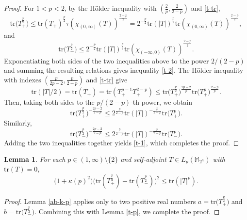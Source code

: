 \documentclass{amsbook}
\newtheorem{lemma}[theorem]{Lemma}
\theoremstyle{definition}
\theoremstyle{remark}
\numberwithin{section}{chapter}
\numberwithin{equation}{chapter}
\newcommand{\1}{\mathbf{1}}
\newcommand{\tr}{\mathrm{tr}}
\begin{document}
\begin{proof}
For $1<p<2$, by the H\"older inequality with $(\frac{2}{p},\frac{2}{2-p})$ and \eqref{t-tr},  
\begin{equation*}
\mathrm{tr}\big(T_+^{\frac{p}{2}}\big)\leq \mathrm{tr}(T_+)^{\frac{p}{2}} \mathbb \tau(\chi_{(0,\infty)}(T))^{\frac{2-p}{2}}=2^{-\frac {p}2}\mathrm{tr}(|T|)^{\frac{p}{2}}\tr\left(\chi_{(0,\infty)}(T)\right)^{\frac{2-p}{2}},
\end{equation*}
and 
\[
\mathrm{tr}\big(T_{-}^{\frac{p}{2}}\big)\leq 2^{-\frac p2}\mathrm{tr}(|T|)^{\frac{p}{2}}\tr(\chi_{(-\infty,0)}(T))^{\frac{2-p}{2}}.
\]
Exponentiating both sides of the two inequalities above to the power $2/(2-p)$ and summing the resulting relations gives inequality \eqref{t-2}. The H\"older inequality with indexes $\left(\frac{p}{2p-2},\frac{p}{2-p}\right)$ and \eqref{t-tr} give
\[
\mathrm{tr}(|T|/2) = \mathrm{tr}(T_+)=\mathrm{tr}\left(T_+^{p-1}T_+^{2-p}\right)\leq \mathrm{tr}\big(T_+^{\frac{p}{2}}\big)^{\frac{2p-2}{p}} \mathrm{tr}\big(T_+^{p}\big)^{\frac{2-p}{p}}.
\]
Then, taking both sides to the \(p/(2-p)\)-th power, we obtain
\[
\mathrm{tr}\big(T_+^{\frac{p}{2}}\big)^{-\frac{2p-2}{2-p}}\leq 2^{\frac{p}{2-p}} \mathrm{tr}(|T|)^{-\frac{p}{2-p}} \mathrm{tr}\big(T_+^{p}\big).
\]
Similarly,
\[
\mathrm{tr}\big(T_{-}^{\frac{p}{2}}\big)^{-\frac{2p-2}{2-p}}\leq 2^{\frac{p}{2-p}} \mathrm{tr}(|T|)^{-\frac{p}{2-p}} \mathrm{tr}\big(T_{-}^{p}\big).
\]
Adding the two inequalities together yields \eqref{t-1}, which completes the proof.
\end{proof}


\begin{lemma}\label{t-kp-trt}
For each $p\in(1,\infty)\setminus\{2\}$ and  self-adjoint $T\in L_p(\mathbb{M}_{2^n})$ with $\mathrm{tr}(T)=0$, 
\[
\bigl(1 + \kappa(p)^2\bigr)\big(\mathrm{tr}(T_+^{\frac{p}{2}})-\mathrm{tr}(T_-^{\frac{p}{2}})\big)^2\leq \mathrm{tr}(|T|^p).
\]
\end{lemma}
\begin{proof}
Lemma \ref{ab-k-p} applies only to two positive real numbers $a = \mathrm{tr}\big(T_+^{\frac{p}{2}}\big)$ and $b = \mathrm{tr}\big(T_-^{\frac{p}{2}}\big)$. Combining this with Lemma \ref{t-p}, we complete the proof.
\end{proof}
\end{document}
